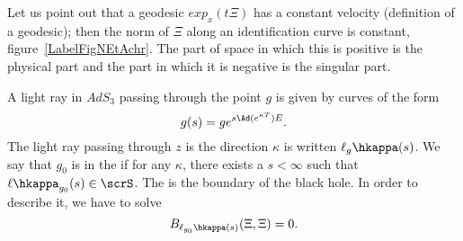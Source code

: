 Let us point out that a geodesic $exp_x(t\Xi)$ has a constant velocity (definition of a geodesic); then the norm of $\Xi$ along an identification curve is constant, figure~\ref{LabelFigNEtAchr}. The part of space in which this is positive is the physical part and the part in which it is negative is the singular part.

\newcommand{\CaptionFigNEtAchr}{The norm (in particular its sing) of \( \Xi\) is contant along a geodesic.}


A light ray in $AdS_3$ passing through the point $g$ is given by curves of the form
\begin{equation}
	g(s)=ge^{s\Ad(e^{\kappa T})E}.
\end{equation}
The light ray passing through $z$ is the direction $\kappa$ is written $\ell_g\hkappa(s)$. We say that $g_0$ is in the  if for any $\kappa$, there exists a $s<\infty$ such that $\ell\hkappa_{g_0}(s)\in\scrS$. The  is the boundary of the black hole. In order to describe it, we have to solve
\begin{equation}
	B_{\ell_{g_0}\hkappa(s)}(\Xi,\Xi)=0.
\end{equation}
